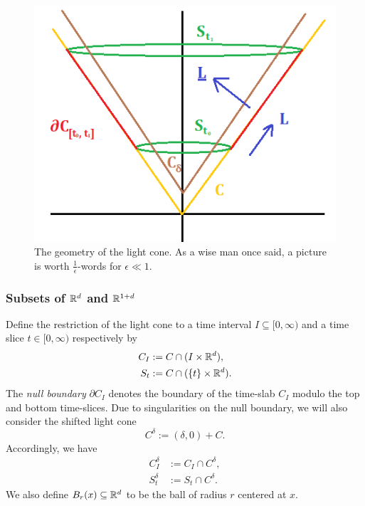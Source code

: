 	\begin{figure}[ht]
		\begin{center}
			\includegraphics{graphics/cone}
			\caption{The geometry of the light cone. As a wise man once said, a picture is worth $\tfrac1\epsilon$-words for $\epsilon \ll 1$. }
		\end{center}	
	\end{figure}		

\subsubsection*{Subsets of $\mathbb R^d$ and $\mathbb R^{1 + d}$}
Define the restriction of the light cone to a time interval $I \subseteq [0, \infty)$ and a time slice $t \in [0, \infty)$ respectively by
	\begin{align*}
		C_I 
			&:= C \cap (I \times \mathbb R^d), \\
		S_{t}
			&:= C \cap (\{t\} \times \mathbb R^d).
	\end{align*}
The \emph{null boundary} $\partial C_I$ denotes the boundary of the time-slab $C_I$ modulo the top and bottom time-slices. Due to singularities on the null boundary, we will also consider the shifted light cone 
	\[ C^\delta := (\delta, 0) + C. \]
Accordingly, we have 
	\begin{align*}
		C^\delta_I
			&:= C_I \cap C^\delta, \\
		S^\delta_t
			&:= S_t \cap C^\delta.		
	\end{align*}	
We also define $B_r (x) \subseteq \mathbb R^d$ to be the ball of radius $r$ centered at $x$. 

